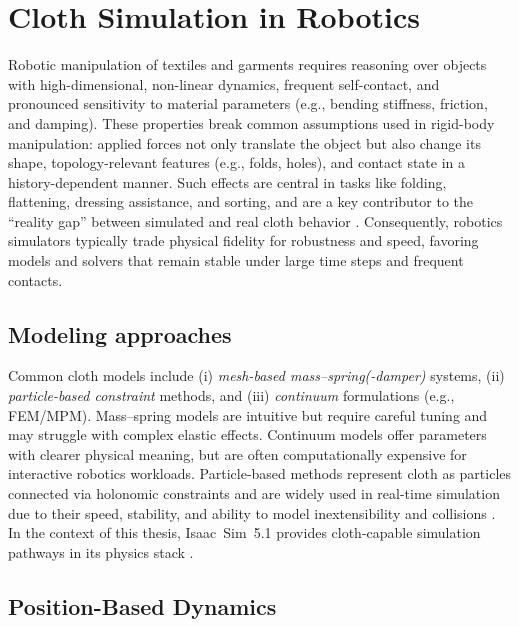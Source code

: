 \section{Cloth Simulation in Robotics}
\label{sec:cloth_sim_robotics}

Robotic manipulation of textiles and garments requires reasoning over objects with
high-dimensional, non-linear dynamics, frequent self-contact, and pronounced sensitivity to
material parameters (e.g., bending stiffness, friction, and damping). These properties break
common assumptions used in rigid-body manipulation: applied forces not only translate the
object but also change its shape, topology-relevant features (e.g., folds, holes), and contact
state in a history-dependent manner. Such effects are central in tasks like folding, flattening,
dressing assistance, and sorting, and are a key contributor to the ``reality gap'' between
simulated and real cloth behavior \cite{longhini2025review_cloth_manipulation}.
Consequently, robotics simulators typically trade physical fidelity for robustness and speed,
favoring models and solvers that remain stable under large time steps and frequent contacts.

\subsection{Modeling approaches}
Common cloth models include (i) \emph{mesh-based mass--spring(-damper)} systems,
(ii) \emph{particle-based constraint} methods, and (iii) \emph{continuum} formulations
(e.g., \ac{FEM}/\ac{MPM}). Mass--spring models are intuitive but require careful tuning and may
struggle with complex elastic effects. Continuum models offer parameters with clearer
physical meaning, but are often computationally expensive for interactive robotics workloads.
Particle-based methods represent cloth as particles connected via holonomic constraints and
are widely used in real-time simulation due to their speed, stability, and ability to model
inextensibility and collisions \cite{longhini2025review_cloth_manipulation}.
In the context of this thesis, Isaac~Sim~5.1 provides cloth-capable simulation pathways in its
physics stack \cite{Muster.2017}.

\subsection{Position-Based Dynamics} %

